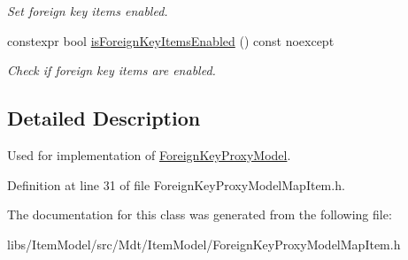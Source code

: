 \begin{DoxyCompactItemize}
\begin{DoxyCompactList}\small\item\em Set foreign key items enabled. \end{DoxyCompactList}\item 
constexpr bool \hyperlink{class_mdt_1_1_item_model_1_1_foreign_key_proxy_model_map_item_flags_afb9a4feeb452d0ddcd90009bc0847cea}{is\+Foreign\+Key\+Items\+Enabled} () const noexcept\hypertarget{class_mdt_1_1_item_model_1_1_foreign_key_proxy_model_map_item_flags_afb9a4feeb452d0ddcd90009bc0847cea}{}\label{class_mdt_1_1_item_model_1_1_foreign_key_proxy_model_map_item_flags_afb9a4feeb452d0ddcd90009bc0847cea}

\begin{DoxyCompactList}\small\item\em Check if foreign key items are enabled. \end{DoxyCompactList}\end{DoxyCompactItemize}


\subsection{Detailed Description}
Used for implementation of \hyperlink{class_mdt_1_1_item_model_1_1_foreign_key_proxy_model}{Foreign\+Key\+Proxy\+Model}. 

Definition at line 31 of file Foreign\+Key\+Proxy\+Model\+Map\+Item.\+h.



The documentation for this class was generated from the following file\+:\begin{DoxyCompactItemize}
\item 
libs/\+Item\+Model/src/\+Mdt/\+Item\+Model/Foreign\+Key\+Proxy\+Model\+Map\+Item.\+h\end{DoxyCompactItemize}
